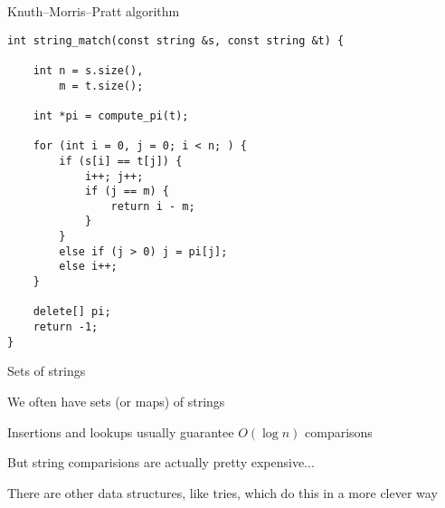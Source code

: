 \begin{frame}[fragile]{Knuth--Morris--Pratt algorithm}
    \begin{verbatim}
int string_match(const string &s, const string &t) {

    int n = s.size(),
        m = t.size();

    int *pi = compute_pi(t);

    for (int i = 0, j = 0; i < n; ) {
        if (s[i] == t[j]) {
            i++; j++;
            if (j == m) {
                return i - m;
            }
        }
        else if (j > 0) j = pi[j];
        else i++;
    }

    delete[] pi;
    return -1;
}
    \end{verbatim}
\end{frame}

\begin{frame}{Sets of strings}
    \bi
\item We often have sets (or maps) of strings
\item Insertions and lookups usually guarantee $O(\log n)$ comparisons
    \vspace{10pt}
\item But string comparisions are actually pretty expensive...
    \vspace{10pt}
\item There are other data structures, like tries, which do this in a more clever way
    \ei
\end{frame}

